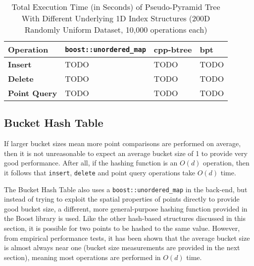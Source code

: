 \begin{table}
	\centering
	\begin{tabular}{|l|l|l|l|}
		\hline
		\textbf{Operation} & \texttt{boost::unordered\_map} & cpp-btree & bpt \\
		\hline
		\textbf{Insert} & TODO & TODO & TODO \\
		\textbf{Delete} & TODO & TODO & TODO \\
		\textbf{Point Query} & TODO & TODO & TODO \\
		\hline
	\end{tabular}
	\caption{Total Execution Time (in Seconds) of Pseudo-Pyramid Tree With Different Underlying 1D Index Structures (200D Randomly Uniform Dataset, 10,000 operations each)}
	\label{tab:hashtable-bplus-time-comparison}
\end{table}

\subsection{Bucket Hash Table}


If larger bucket sizes mean more point comparisons are performed on average, then it is not unreasonable to expect an average bucket size of 1 to provide very good performance. After all, if the hashing function is an $O(d)$ operation, then it follows that \texttt{insert}, \texttt{delete} and point query operations take $O(d)$ time. 

The Bucket Hash Table also uses a \texttt{boost::unordered\_map} in the back-end, but instead of trying to exploit the spatial properties of points directly to provide good bucket size, a different, more general-purpose hashing function provided in the Boost library is used. Like the other hash-based structures discussed in this section, it is possible for two points to be hashed to the same value. However, from empirical performance tests, it has been shown that the average bucket size is almost always near one (bucket size measurements are provided in the next section), meaning most operations are performed in $O(d)$ time.

